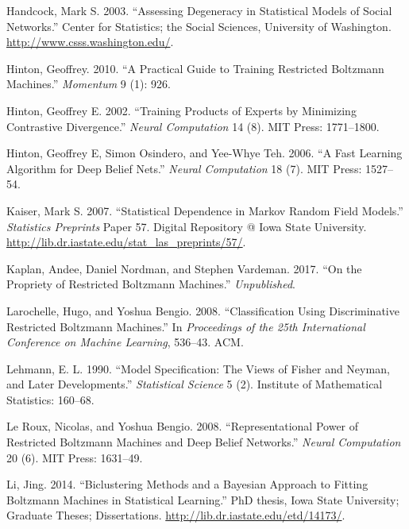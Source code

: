 \documentclass[AMS,STIX1COL]{WileyNJD-v2}
\begin{document}
\leavevmode\hypertarget{ref-handcock2003assessing}{}%
Handcock, Mark S. 2003. ``Assessing Degeneracy in Statistical Models of
Social Networks.'' Center for Statistics; the Social Sciences,
University of Washington. \url{http://www.csss.washington.edu/}.

\leavevmode\hypertarget{ref-hinton2010practical}{}%
Hinton, Geoffrey. 2010. ``A Practical Guide to Training Restricted
Boltzmann Machines.'' \emph{Momentum} 9 (1): 926.

\leavevmode\hypertarget{ref-hinton2002training}{}%
Hinton, Geoffrey E. 2002. ``Training Products of Experts by Minimizing
Contrastive Divergence.'' \emph{Neural Computation} 14 (8). MIT Press:
1771--1800.

\leavevmode\hypertarget{ref-hinton2006fast}{}%
Hinton, Geoffrey E, Simon Osindero, and Yee-Whye Teh. 2006. ``A Fast
Learning Algorithm for Deep Belief Nets.'' \emph{Neural Computation} 18
(7). MIT Press: 1527--54.

\leavevmode\hypertarget{ref-kaiser2007statistical}{}%
Kaiser, Mark S. 2007. ``Statistical Dependence in Markov Random Field
Models.'' \emph{Statistics Preprints} Paper 57. Digital Repository @
Iowa State University.
\url{http://lib.dr.iastate.edu/stat_las_preprints/57/}.

\leavevmode\hypertarget{ref-kaplan2016propriety}{}%
Kaplan, Andee, Daniel Nordman, and Stephen Vardeman. 2017. ``On the
Propriety of Restricted Boltzmann Machines.'' \emph{Unpublished}.

\leavevmode\hypertarget{ref-larochelle2008classification}{}%
Larochelle, Hugo, and Yoshua Bengio. 2008. ``Classification Using
Discriminative Restricted Boltzmann Machines.'' In \emph{Proceedings of
the 25th International Conference on Machine Learning}, 536--43. ACM.

\leavevmode\hypertarget{ref-lehmann1990model}{}%
Lehmann, E. L. 1990. ``Model Specification: The Views of Fisher and
Neyman, and Later Developments.'' \emph{Statistical Science} 5 (2).
Institute of Mathematical Statistics: 160--68.

\leavevmode\hypertarget{ref-le2008representational}{}%
Le Roux, Nicolas, and Yoshua Bengio. 2008. ``Representational Power of
Restricted Boltzmann Machines and Deep Belief Networks.'' \emph{Neural
Computation} 20 (6). MIT Press: 1631--49.

\leavevmode\hypertarget{ref-li2014biclustering}{}%
Li, Jing. 2014. ``Biclustering Methods and a Bayesian Approach to
Fitting Boltzmann Machines in Statistical Learning.'' PhD thesis, Iowa
State University; Graduate Theses; Dissertations.
\url{http://lib.dr.iastate.edu/etd/14173/}.
\end{document}
